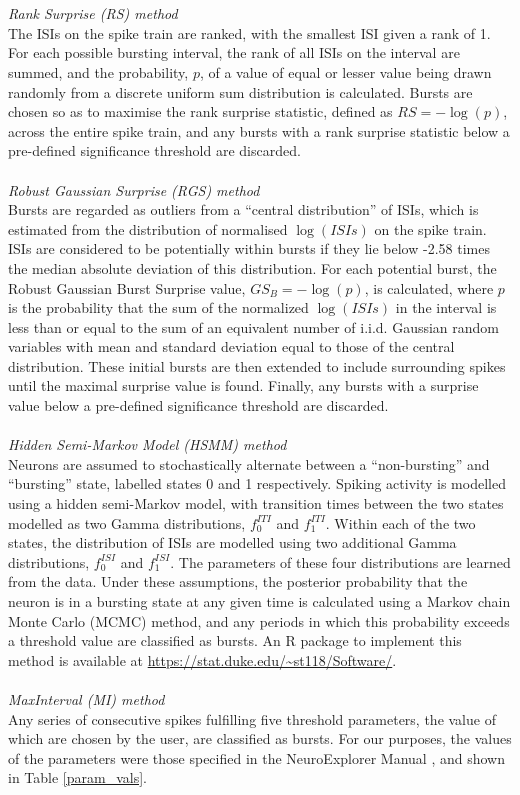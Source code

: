 \documentclass[12pt, titlepage]{article}
\begin{document}
	\\ \\ \textit{Rank Surprise (RS) method \cite{Gourevitch2007}}
	\\The ISIs on the spike train are ranked,  with the smallest ISI given a rank of 1. For each possible bursting interval, the rank of all ISIs on the interval are summed, and the probability, $p$, of a value of equal or lesser value  being drawn randomly from a discrete uniform sum distribution is calculated. Bursts are chosen so as to maximise the rank surprise statistic, defined as $RS=-\log(p)$, across the entire spike train, and any bursts with a rank surprise statistic below a pre-defined significance threshold are discarded\nocite{Gourevitch2007}. 
	\\ \\ \textit{Robust Gaussian Surprise (RGS) method \cite{Ko2012}}
	\\Bursts are regarded as outliers from a ``central distribution'' of ISIs, which is estimated from the distribution of normalised $\log(ISIs)$ on the spike train. ISIs are considered to be potentially within bursts if they lie below -2.58 times the median absolute deviation of this distribution. For each potential burst, the Robust Gaussian Burst Surprise value, $GS_B=-\log(p)$, is calculated, where $p$ is the probability that the sum of the normalized $\log(ISIs)$ in the interval is less than or equal to the sum of an equivalent number of i.i.d. Gaussian random variables with mean and standard deviation equal to those of the central distribution. These initial bursts are then extended to include surrounding spikes until the maximal surprise value is found. Finally, any bursts with a surprise value below a pre-defined significance threshold are discarded.
	\\ \\ \textit{Hidden Semi-Markov Model (HSMM) method \cite{Tokdar2010}}
	\\Neurons are assumed to stochastically alternate between a ``non-bursting'' and ``bursting'' state, labelled states 0 and 1 respectively. Spiking activity is modelled using a hidden semi-Markov model, with transition times between the two states modelled as two Gamma distributions,  $f_0^{ITI}$ and $f_1^{ITI}$.  Within each of the two states, the distribution of ISIs are modelled using two additional Gamma distributions, $f_0^{ISI}$ and $f_1^{ISI}$. The parameters of these four distributions are learned from the data. Under these assumptions, the posterior probability that the neuron is in a bursting state at any given time is calculated using a Markov chain Monte Carlo (MCMC) method, and any periods in which this probability exceeds a threshold value are classified as bursts. An R package to implement this method is available at \url{https://stat.duke.edu/~st118/Software/}.
	\\ \\ \textit{MaxInterval (MI) method  \cite{NEmanual}}
	\\Any series of consecutive spikes fulfilling five threshold parameters, the value of which are chosen by the user, are classified as bursts. For our purposes, the values of the parameters were those specified in the NeuroExplorer Manual \cite{NEmanual}, and shown in Table \ref{param_vals}.
\end{document}
